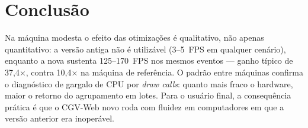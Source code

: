 \documentclass[11pt,a4paper]{article}
\begin{document}
\section{Conclus\~ao}

Na m\'aquina modesta o efeito das otimiza\c{c}\~oes \'e qualitativo, n\~ao apenas quantitativo:
a vers\~ao antiga n\~ao \'e utiliz\'avel (3--5~FPS em qualquer cen\'ario), enquanto a nova
sustenta 125--170~FPS nos mesmos eventos --- ganho t\'ipico de 37{,}4$\times$, contra
10{,}4$\times$ na m\'aquina de refer\^encia. O padr\~ao entre m\'aquinas confirma o diagn\'ostico
de gargalo de CPU por \emph{draw calls}: quanto mais fraco o hardware, maior o retorno do
agrupamento em lotes. Para o usu\'ario final, a consequ\^encia pr\'atica \'e que o CGV-Web novo
roda com fluidez em computadores em que a vers\~ao anterior era inoper\'avel.
\end{document}
